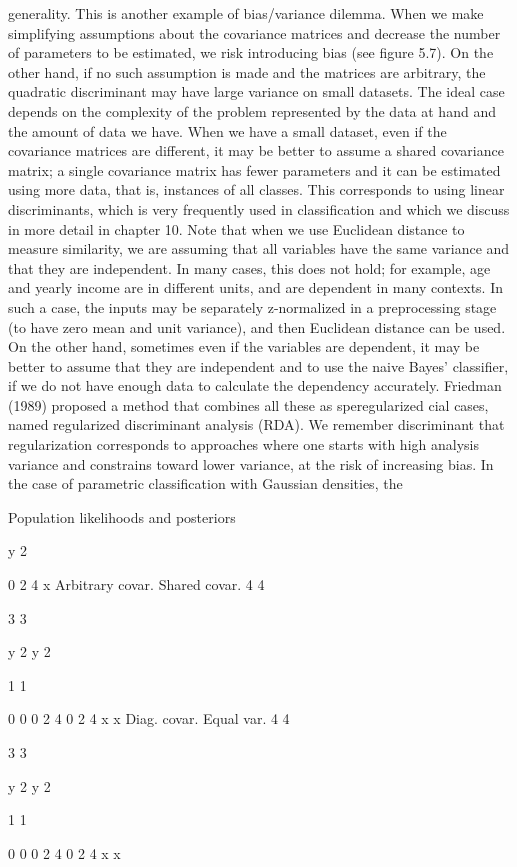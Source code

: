 generality. This is another example of bias/variance dilemma. When we make simplifying assumptions about the covariance matrices and decrease the number of parameters to be estimated, we risk introducing bias (see figure 5.7). On the other hand, if no such assumption is made and the matrices are arbitrary, the quadratic discriminant may have large variance on small datasets. The ideal case depends on the complexity of the problem represented by the data at hand and the amount of data we have. When we have a small dataset, even if the covariance matrices are different, it may be better to assume a shared covariance matrix; a single covariance matrix has fewer parameters and it can be estimated using more data, that is, instances of all classes. This corresponds to using linear discriminants, which is very frequently used in classification and which we discuss in more detail in chapter 10. Note that when we use Euclidean distance to measure similarity, we are assuming that all variables have the same variance and that they are independent. In many cases, this does not hold; for example, age and yearly income are in different units, and are dependent in many contexts. In such a case, the inputs may be separately z-normalized in a preprocessing stage (to have zero mean and unit variance), and then Euclidean distance can be used. On the other hand, sometimes even if the variables are dependent, it may be better to assume that they are independent and to use the naive Bayes’ classifier, if we do not have enough data to calculate the dependency accurately. Friedman (1989) proposed a method that combines all these as speregularized cial cases, named regularized discriminant analysis (RDA). We remember discriminant that regularization corresponds to approaches where one starts with high analysis variance and constrains toward lower variance, at the risk of increasing bias. In the case of parametric classification with Gaussian densities, the

Population likelihoods and posteriors

y 2

0 2 4 x Arbitrary covar. Shared covar. 4 4

3 3

y 2 y 2

1 1

0 0 0 2 4 0 2 4 x x Diag. covar. Equal var. 4 4

3 3

y 2 y 2

1 1

0 0 0 2 4 0 2 4 x x

